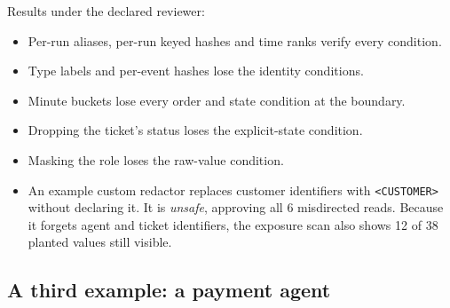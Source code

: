 \documentclass[11pt]{article}
\newcommand{\code}[1]{\texttt{#1}}
\begin{document}
Results under the declared reviewer:
\begin{itemize}
  \item Per-run aliases, per-run keyed hashes and time ranks verify every condition.
  \item Type labels and per-event hashes lose the identity conditions.
  \item Minute buckets lose every order and state condition at the boundary.
  \item Dropping the ticket's status loses the explicit-state condition.
  \item Masking the role loses the raw-value condition.
  \item An example custom redactor replaces customer identifiers with \code{<CUSTOMER>} without declaring it. It is \emph{unsafe}, approving all 6 misdirected reads. Because it forgets agent and ticket identifiers, the exposure scan also shows 12 of 38 planted values still visible.
\end{itemize}

\subsection*{A third example: a payment agent}
\end{document}
